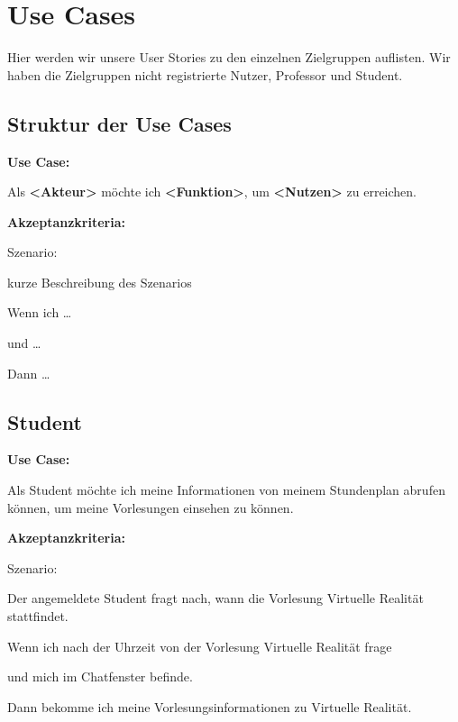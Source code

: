 \section{Use Cases}
Hier werden wir unsere User Stories zu den einzelnen Zielgruppen auflisten.
Wir haben die Zielgruppen nicht registrierte Nutzer, Professor und Student.

\subsection{Struktur der Use Cases}
\textbf{Use Case:}
\newline

\noindent Als \textbf{<Akteur>} möchte ich \textbf{<Funktion>}, um \textbf{<Nutzen>} zu erreichen.
\newline

\noindent \textbf{Akzeptanzkriteria:}
\newline

\noindent Szenario: 

\noindent kurze Beschreibung des Szenarios
\newline

\noindent Wenn ich \dots

\noindent und \dots

\noindent Dann \dots

\subsection{Student}

\textbf{Use Case:}
\newline

\noindent Als Student möchte ich meine Informationen von meinem Stundenplan abrufen können,
um meine Vorlesungen einsehen zu können.
\newline

\noindent \textbf{Akzeptanzkriteria:}
\newline

\noindent Szenario: 

\noindent Der angemeldete Student fragt nach, wann die Vorlesung Virtuelle Realität stattfindet.
\newline

\noindent Wenn ich nach der Uhrzeit von der Vorlesung Virtuelle Realität frage

\noindent und mich im Chatfenster befinde.

\noindent Dann bekomme ich meine Vorlesungsinformationen zu Virtuelle Realität.

